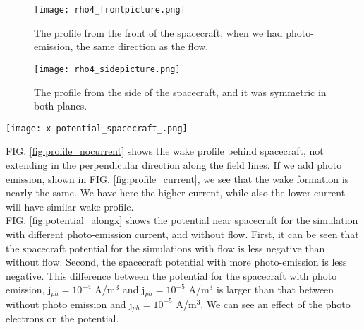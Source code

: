 \documentclass[aip, 
rsi, 
amsmath,
amssymb,
longbibliography,
reprint]{revtex4-1}
\begin{document}
\begin{figure*}
\begin{subfigure}{0.45\textwidth}
\texttt{[image: rho4\_frontpicture.png]}
\caption{The profile from the front of the spacecraft, when we had photo-emission, the same direction as the flow.}
\end{subfigure}
\begin{subfigure}{0.45\textwidth}
\texttt{[image: rho4\_sidepicture.png]}
\caption{The profile from the side of the spacecraft, and it was symmetric in both planes.}
\end{subfigure}
\caption{The electron density(the phoe notation is used) distribution pictures: the situation when there is photo-emission of the j$_{ph} = 10^{-5}$ A/m$^3$ value. The wake is similar to the one in FIG. \ref{fig:profile_nocurrent}. \label{fig:profile_current}}
\end{figure*}

\begin{figure*}
\texttt{[image: x-potential\_spacecraft\_.png]}
\caption{The potential along the flow direction for different photo emissions, emitting directly to the wake. Top line is the simulation with the photo-emission current set to $j_{ph} = 10^{-4}$ A/m$^3$, then to $10^{-5}$ A/m$^3$ and without photo emission. We also added the potential for the situation with no plasma flow, seen in the bottom.
\label{fig:potential_alongx}}
\end{figure*}

FIG. \ref{fig:profile_nocurrent} shows the wake profile behind spacecraft, not extending in the perpendicular direction along the field lines. If we add photo emission,  shown in FIG. \ref{fig:profile_current}, we see that the wake formation is nearly the same. We have here the higher current, while also the lower current will have similar wake profile.\\

FIG. \ref{fig:potential_alongx} shows the potential near spacecraft for the simulation with different photo-emission current, and without flow. First, it can be seen that the spacecraft potential for the simulations with flow is less negative than without flow. Second, the spacecraft potential with more photo-emission is less negative. This difference between the potential for the spacecraft  with photo emission, j$_{ph} = 10^{-4}$ A/m$^3$ and  j$_{ph} = 10^{-5}$ A/m$^3$ is larger than that between without photo emission and  j$_{ph} = 10^{-5}$ A/m$^3$. We can see an effect of the photo electrons on the potential.\\
\end{document}
